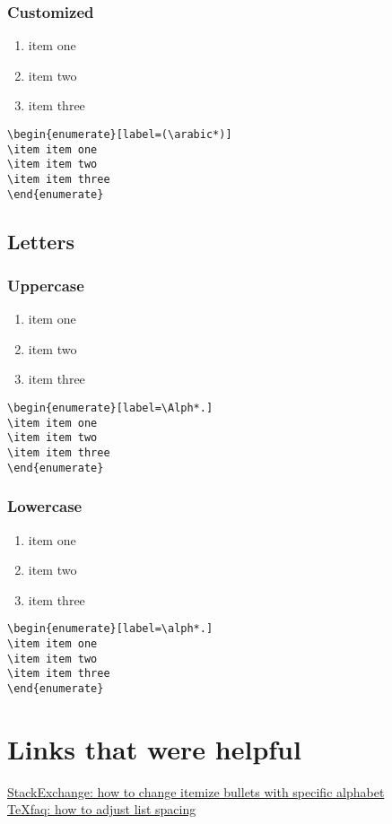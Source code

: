 \documentclass[12pt, letterpaper]{article}
\begin{document}
\subsubsection{Customized}
\begin{enumerate}[label=(\arabic*)]
		\item item one 
		\item item two
		\item item three
\end{enumerate}
\begin{lstlisting}
\begin{enumerate}[label=(\arabic*)]
\item item one 
\item item two
\item item three
\end{enumerate}
\end{lstlisting}


\subsection{Letters}

\subsubsection{Uppercase}
\begin{enumerate}[label=\Alph*.]
	\item item one 
	\item item two
	\item item three
\end{enumerate}
\begin{lstlisting}
\begin{enumerate}[label=\Alph*.]
\item item one 
\item item two
\item item three
\end{enumerate}
\end{lstlisting}

\subsubsection{Lowercase}
\begin{enumerate}[label=\alph*.]
	\item item one 
	\item item two
	\item item three
\end{enumerate}
\begin{lstlisting}
\begin{enumerate}[label=\alph*.]
\item item one 
\item item two
\item item three
\end{enumerate}
\end{lstlisting}


\section{Links that were helpful} 
\href{https://tex.stackexchange.com/questions/278877/how-to-change-itemize-bullets-with-specific-alphabet}{StackExchange: how to change itemize bullets with specific alphabet} \\
\href{https://texfaq.org/FAQ-complist}{TeXfaq: how to adjust list spacing}
\end{document}
